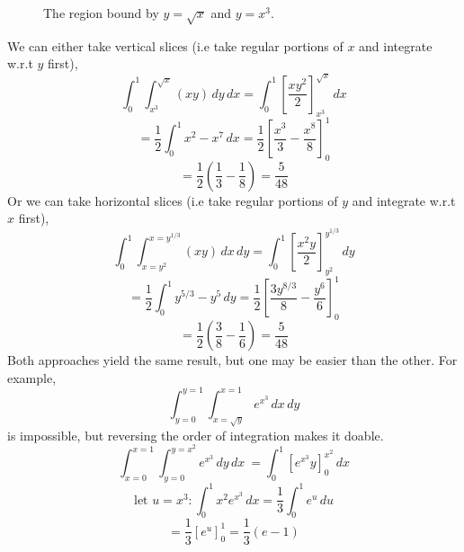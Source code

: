 \documentclass[10pt]{book}
\begin{document}
\begin{figure}[h]
  \centering
  \caption{The region bound by $y=\sqrt{x}$ and $y=x^3$.}
  \label{fig:doule-integral-fig1}
\end{figure}
We can either take vertical slices (i.e take regular portions of $x$ and integrate w.r.t $y$ first),
\[
  \int_{0}^{1} \int_{x^3}^{\sqrt{x}} (xy)  \,dy \,dx = \int_{0}^{1} \left[ \dfrac{xy^2}{2} \right]_{x^3}^{\sqrt{x}} \,dx
\]
\[
  = \dfrac{1}{2} \int_{0}^{1} x^2 - x^7 \,dx = \dfrac{1}{2} \left[ \dfrac{x^3}{3} - \dfrac{x^8}{8} \right]_{0}^{1}
\]
\[
  = \dfrac{1}{2} \left( \dfrac{1}{3} - \dfrac {1}{8} \right) = \dfrac{5}{48}
\]
Or we can take horizontal slices (i.e take regular portions of $y$ and integrate w.r.t $x$ first),
\[
  \int_{0}^{1} \int^{x=y^{1/3}}_{x=y^2} (xy) \,dx \,dy = \int_{0}^{1} \left[ \dfrac{x^2y}{2} \right]^{y^{1/3}}_{y^2} \,dy
\]
\[
  = \dfrac{1}{2} \int_{0}^{1} y^{5/3} - y^5 \,dy = \dfrac{1}{2} \left[ \dfrac{3y^{8/3}}{8} - \dfrac{y^6}{6} \right]_{0}^{1}
\]
\[
  = \dfrac{1}{2} \left( \dfrac{3}{8} - \dfrac{1}{6} \right) = \dfrac{5}{48}
\]
Both approaches yield the same result, but one may be easier than the other. For example,
\[\int_{y=0}^{y=1} \int_{x=\sqrt{y}}^{x=1} e^{x^3} \,dx \,dy\]
is impossible, but reversing the order of integration makes it doable.
\[\int_{x=0}^{x=1} \int_{y=0}^{y=x^2} e^{x^3} \,dy \,dx \ = \int_{0}^{1} \left[ e^{x^3}y \right]^{x^2}_0 \,dx \]
\[\text{let }u=x^3 : \int_{0}^{1} x^2e^{x^3} \,dx = \dfrac{1}{3} \int_{0}^{1} e^u \,du\]
\[= \dfrac{1}{3} \left[ e^u \right]^{1}_{0} = \dfrac{1}{3}(e-1)\]
\end{document}
